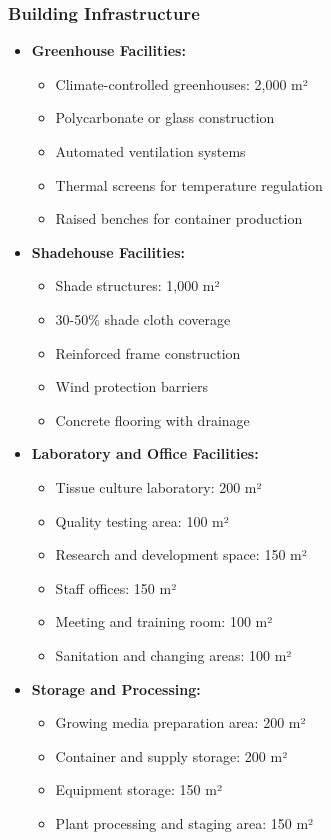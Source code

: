 \subsubsection{Building Infrastructure}
\begin{itemize}
    \item \textbf{Greenhouse Facilities:}
    \begin{itemize}
        \item Climate-controlled greenhouses: 2,000 m²
        \item Polycarbonate or glass construction
        \item Automated ventilation systems
        \item Thermal screens for temperature regulation
        \item Raised benches for container production
    \end{itemize}
    
    \item \textbf{Shadehouse Facilities:}
    \begin{itemize}
        \item Shade structures: 1,000 m²
        \item 30-50\% shade cloth coverage
        \item Reinforced frame construction
        \item Wind protection barriers
        \item Concrete flooring with drainage
    \end{itemize}
    
    \item \textbf{Laboratory and Office Facilities:}
    \begin{itemize}
        \item Tissue culture laboratory: 200 m²
        \item Quality testing area: 100 m²
        \item Research and development space: 150 m²
        \item Staff offices: 150 m²
        \item Meeting and training room: 100 m²
        \item Sanitation and changing areas: 100 m²
    \end{itemize}
    
    \item \textbf{Storage and Processing:}
    \begin{itemize}
        \item Growing media preparation area: 200 m²
        \item Container and supply storage: 200 m²
        \item Equipment storage: 150 m²
        \item Plant processing and staging area: 150 m²
    \end{itemize}
\end{itemize}


